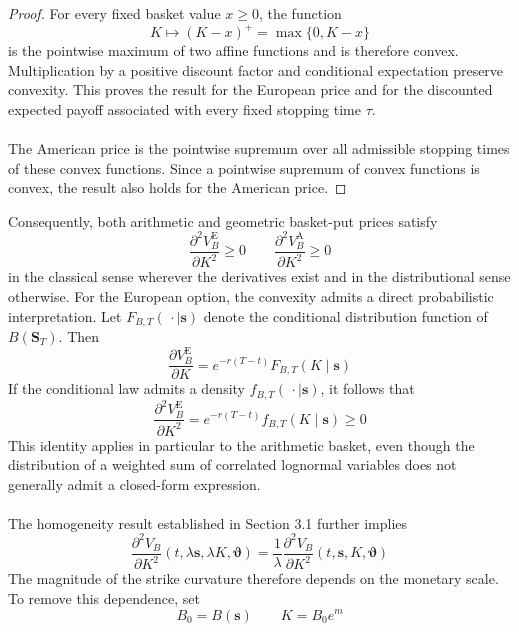 \documentclass{article}
\numberwithin{equation}{subsection}
\theoremstyle{definition}
\theoremstyle{remark}
\begin{document}
\begin{proof}
For every fixed basket value \(x\geq 0\), the function
\begin{equation}
K
\longmapsto
(K-x)^+
=
\max\{0,K-x\}
\end{equation}
is the pointwise maximum of two affine functions and is therefore convex. Multiplication by a positive discount factor and conditional expectation preserve convexity. This proves the result for the European price and for the discounted expected payoff associated with every fixed stopping time \(\tau\). \\
\\
The American price is the pointwise supremum over all admissible stopping times of these convex functions. Since a pointwise supremum of convex functions is convex, the result also holds for the American price.
\end{proof}
Consequently, both arithmetic and geometric basket-put prices satisfy
\begin{equation}
\frac{\partial^2 V_B^{\mathrm{E}}}{\partial K^2}
\geq 0
\qquad
\frac{\partial^2 V_B^{\mathrm{A}}}{\partial K^2}
\geq 0
\end{equation}
in the classical sense wherever the derivatives exist and in the distributional sense otherwise.
For the European option, the convexity admits a direct probabilistic interpretation. Let \(F_{B,T}(\,\cdot\mid\boldsymbol{s})\) denote the conditional distribution function of \(B(\boldsymbol{S}_T)\). Then
\begin{equation}
\frac{\partial V_B^{\mathrm{E}}}{\partial K}
=
e^{-r(T-t)}
F_{B,T}(K\mid\boldsymbol{s})
\end{equation}
If the conditional law admits a density \(f_{B,T}(\,\cdot\mid\boldsymbol{s})\), it follows that
\begin{equation}
\frac{\partial^2 V_B^{\mathrm{E}}}{\partial K^2}
=
e^{-r(T-t)}
f_{B,T}(K\mid\boldsymbol{s})
\geq 0
\end{equation}
This identity applies in particular to the arithmetic basket, even though the distribution of a weighted sum of correlated lognormal variables does not generally admit a closed-form expression. \\
\\
The homogeneity result established in Section 3.1 further implies
\begin{equation}
\frac{\partial^2 V_B}{\partial K^2}
(t,\lambda\boldsymbol{s},\lambda K,\boldsymbol{\vartheta})
=
\frac{1}{\lambda}
\frac{\partial^2 V_B}{\partial K^2}
(t,\boldsymbol{s},K,\boldsymbol{\vartheta})
\end{equation}
The magnitude of the strike curvature therefore depends on the monetary scale. To remove this dependence, set
\begin{equation}
B_0=B(\boldsymbol{s})
\qquad
K=B_0e^m
\end{equation}
\end{document}
